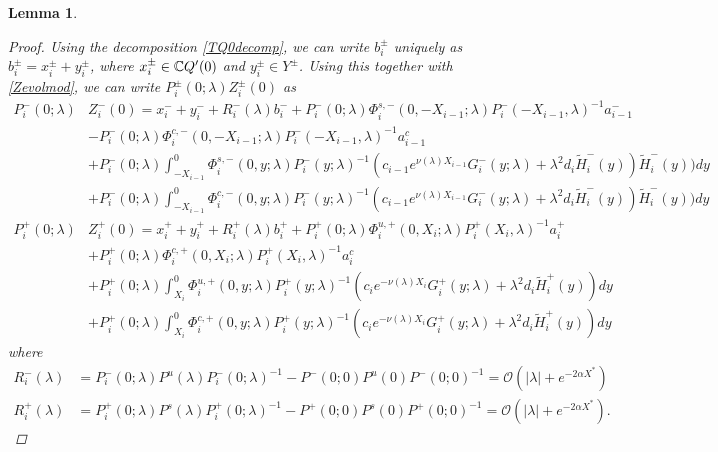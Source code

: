 \documentclass[10pt,reqno]{amsart}
\theoremstyle{plain}
\newtheorem{lemma}[theorem]{Lemma}
\theoremstyle{definition}
\theoremstyle{remark}
\numberwithin{theorem}{section}
\numberwithin{equation}{section}
\begin{document}
\begin{lemma}
\begin{proof}
Using the decomposition \cref{TQ0decomp}, we can write $b_i^\pm$ uniquely as $b_i^\pm = x_i^\pm + y_i^\pm$, where $x_i^\pm \in \mathbb{C} Q'(0)$ and $y_i^\pm \in Y^\pm$. Using this together with \cref{Zevolmod}, we can write $P_i^\pm(0; \lambda) Z_i^\pm(0)$ as
\begin{equation}\label{PipmZ0}
\begin{aligned}
P_i^-(0; \lambda) &Z_i^-(0) = x_i^- + y_i^- + R_i^-(\lambda) b_i^- + P_i^-(0; \lambda) \Phi_i^{s,-}(0, -X_{i-1}; \lambda) P_i^-(-X_{i-1}, \lambda)^{-1} a_{i-1}^- \\
&- P_i^-(0; \lambda) \Phi_i^{c,-}(0, -X_{i-1}; \lambda) P_i^-(-X_{i-1}, \lambda)^{-1} a_{i-1}^c \\
&+ P_i^-(0; \lambda) \int_{-X_{i-1}}^0 \Phi_i^{s,-}(0, y; \lambda) P_i^-(y; \lambda)^{-1} (c_{i-1} e^{\nu(\lambda)X_{i-1}}
 G_i^-(y; \lambda) + \lambda^2 d_i \tilde{H}_i^-(y)) \tilde{H}_i^-(y)) dy \\
&+ P_i^-(0; \lambda) \int_{-X_{i-1}}^0 \Phi_i^{c,-}(0, y; \lambda) P_i^-(y; \lambda)^{-1} (c_{i-1} e^{\nu(\lambda)X_{i-1}}
 G_i^-(y; \lambda) + \lambda^2 d_i \tilde{H}_i^-(y)) \tilde{H}_i^-(y)) dy  \\ 
P_i^+(0; \lambda) &Z_i^+(0) = x_i^+ + y_i^+ + R_i^+(\lambda) b_i^+ + P_i^+(0; \lambda) \Phi_i^{u,+}(0, X_i; \lambda) P_i^+(X_i, \lambda)^{-1} a_i^+ \\
&+ P_i^+(0; \lambda) \Phi_i^{c,+}(0, X_i; \lambda) P_i^+(X_i, \lambda)^{-1} a_i^c \\
&+ P_i^+(0; \lambda) \int_{X_i}^0 \Phi_i^{u,+}(0, y; \lambda) P_i^+(y; \lambda)^{-1}( c_i e^{-\nu(\lambda)X_i} G_i^+(y; \lambda) + \lambda^2 d_i \tilde{H}_i^+(y)) dy \\
&+ P_i^+(0; \lambda) \int_{X_i}^0 \Phi_i^{c,+}(0, y; \lambda) P_i^+(y; \lambda)^{-1}( c_i e^{-\nu(\lambda)X_i} G_i^+(y; \lambda) + \lambda^2 d_i \tilde{H}_i^+(y)) dy 
\end{aligned}
\end{equation}
where 
\begin{equation}\label{Ripmbound}
\begin{aligned}
R_i^-(\lambda) &= P_i^-(0; \lambda) P^u(\lambda) P_i^-(0; \lambda)^{-1} 
- P^-(0; 0) P^u(0) P^-(0; 0)^{-1} = \mathcal{O}(|\lambda| + e^{-2 \alpha X^*}) \\
R_i^+(\lambda) &= P_i^+(0; \lambda) P^s(\lambda) P_i^+(0; \lambda)^{-1} 
- P^+(0; 0) P^s(0) P^+(0; 0)^{-1} = \mathcal{O}(|\lambda| + e^{-2 \alpha X^*}).
\end{aligned}

\end{equation}
\end{proof}
\end{lemma}
\end{document}
